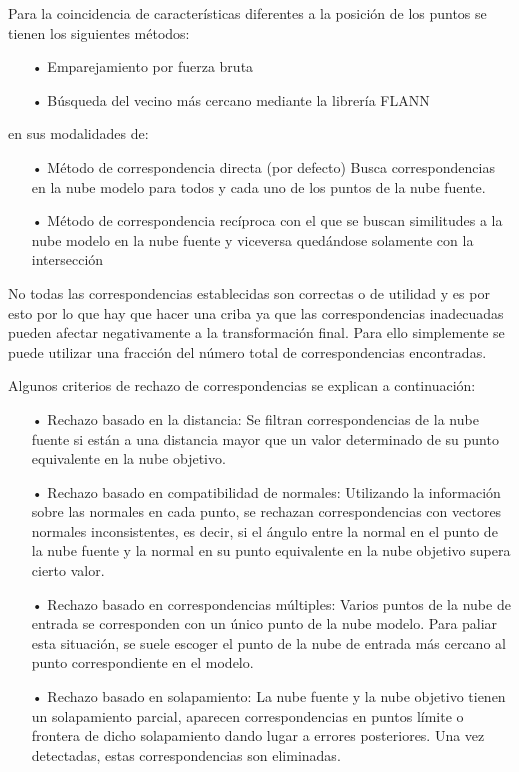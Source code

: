 Para la coincidencia de características diferentes a la posición de los puntos se tienen los siguientes métodos: 
\begin{itemize}
\item[•]Emparejamiento por fuerza bruta
\item[•]Búsqueda del vecino más cercano mediante la librería FLANN
\end{itemize}
en sus modalidades de:
\begin{itemize}
\item[•]Método de correspondencia directa (por defecto) Busca correspondencias en la nube modelo para todos y cada uno de los puntos de la nube fuente.
\item[•]Método de correspondencia recíproca con el que se buscan similitudes a la nube modelo en la nube fuente y viceversa quedándose solamente con la intersección
\end{itemize}

No todas las correspondencias establecidas son correctas o de utilidad y es por esto por lo que hay que hacer una criba ya que las correspondencias inadecuadas pueden afectar negativamente a la transformación final. Para ello simplemente se puede utilizar una fracción del número total de correspondencias encontradas.



Algunos criterios de rechazo de correspondencias se explican a continuación:

\begin{itemize}
\item[•]Rechazo basado en la distancia:
Se filtran correspondencias de la nube fuente si están a una distancia mayor que un valor determinado de su punto equivalente en la nube objetivo.
\item[•]Rechazo basado en compatibilidad de normales:
Utilizando la información sobre las normales en cada punto, se rechazan correspondencias con vectores normales inconsistentes, es decir, si el ángulo entre la normal en el punto de la nube fuente y la normal en su punto equivalente en la nube objetivo supera cierto valor.
\item[•]Rechazo basado en correspondencias múltiples: 
Varios puntos de la nube de entrada se corresponden con un único punto de la nube modelo. Para paliar esta situación, se suele escoger el punto de la nube de entrada más cercano al punto correspondiente en el modelo.
\item[•]Rechazo basado en solapamiento:
La nube fuente y la nube objetivo tienen un solapamiento parcial, aparecen correspondencias en puntos límite o frontera de dicho solapamiento dando lugar a errores posteriores. Una vez detectadas, estas correspondencias son eliminadas. 
\end{itemize}

